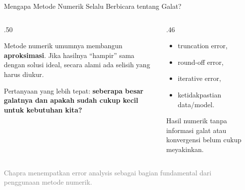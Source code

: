 \documentclass[aspectratio=169,10pt]{beamer}
\newcommand{\smallgray}[1]{\textcolor{GrayText}{\scriptsize #1}}
\begin{document}
\begin{frame}{Mengapa Metode Numerik Selalu Berbicara tentang Galat?}
\small
\begin{columns}[T,totalwidth=\textwidth]
\begin{column}{.50\textwidth}
\begin{bluebox}[Numerik = hampiran]
Metode numerik umumnya membangun \textbf{aproksimasi}. Jika hasilnya ``hampir'' sama dengan solusi ideal, secara alami ada selisih yang harus diukur.
\end{bluebox}
\begin{orangebox}
Pertanyaan yang lebih tepat: \textbf{seberapa besar galatnya dan apakah sudah cukup kecil untuk kebutuhan kita?}
\end{orangebox}
\end{column}
\begin{column}{.46\textwidth}
\begin{greenbox}
\begin{itemize}\setlength\itemsep{2pt}
\item truncation error,
\item round-off error,
\item iterative error,
\item ketidakpastian data/model.
\end{itemize}
\end{greenbox}
\begin{goldbox}[Pelajaran]
Hasil numerik tanpa informasi galat atau konvergensi belum cukup meyakinkan.
\end{goldbox}
\end{column}
\end{columns}
\vfill
\smallgray{Chapra menempatkan error analysis sebagai bagian fundamental dari penggunaan metode numerik.}
\end{frame}
\end{document}
